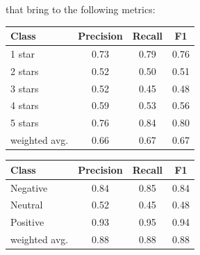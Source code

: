             that bring to the following metrics:

            \begin{table}[H]
                \centering
                \begin{minipage}{0.48\textwidth}
                    \centering
                    \begin{tabular}{l c c c}
                        \toprule
                        \textbf{Class} & \textbf{Precision} & \textbf{Recall} & \textbf{F1} \\                  
                        \midrule
                        1 star & 0.73 & 0.79 & 0.76 \\
                        2 stars & 0.52 & 0.50 & 0.51 \\
                        3 stars & 0.52 & 0.45 & 0.48 \\
                        4 stars & 0.59 & 0.53 & 0.56 \\
                        5 stars & 0.76 & 0.84 & 0.80 \\
                        \midrule
                        weighted avg. & 0.66 & 0.67 & 0.67 \\
                        \bottomrule
                    \end{tabular}
                    \label{tab:5-class_roberta_metrics}
                \end{minipage}\hfill
                \begin{minipage}{0.48\textwidth}
                    \centering
                    \begin{tabular}{l c c c}
                        \toprule
                        \textbf{Class} & \textbf{Precision} & \textbf{Recall} & \textbf{F1} \\                  
                        \midrule
                        Negative & 0.84 & 0.85 & 0.84 \\
                        Neutral & 0.52 & 0.45 & 0.48 \\
                        Positive & 0.93 & 0.95 & 0.94 \\
                        \midrule
                        weighted avg. & 0.88 & 0.88 & 0.88 \\
                        \bottomrule
                    \end{tabular}
                    \label{tab:3-class_roberta_metrics}
                \end{minipage}\hfill
            \end{table}

